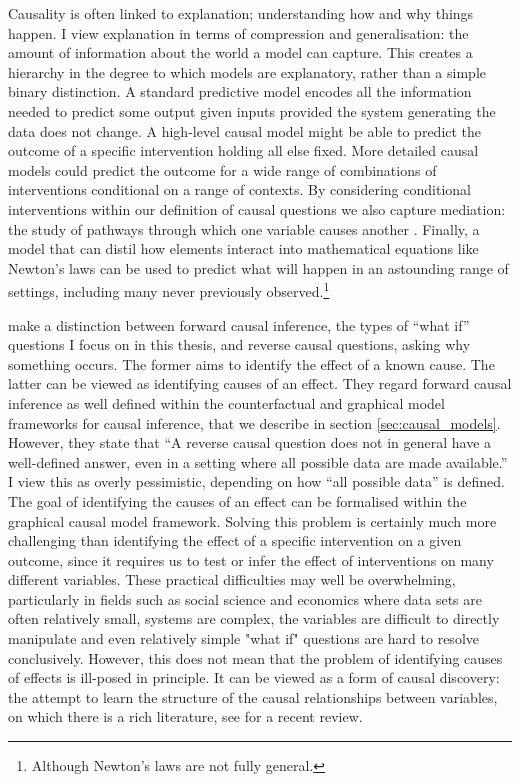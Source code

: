 \documentclass[11pt,a4paper,twoside]{report}
\newcommand{\quotes}[1]{``#1''}
\theoremstyle{plain}
\theoremstyle{definition}
\begin{document}
Causality is often linked to explanation; understanding how and why things happen. I view explanation in terms of compression and generalisation: the amount of information about the world a model can capture. This creates a hierarchy in the degree to which models are explanatory, rather than a simple binary distinction. A standard predictive model encodes all the information needed to predict some output given inputs provided the system generating the data does not change. A high-level causal model might be able to predict the outcome of a specific intervention holding all else fixed. More detailed causal models could predict the outcome for a wide range of combinations of interventions conditional on a range of contexts. By considering conditional interventions within our definition of causal questions we also capture mediation: the study of pathways through which one variable causes another \cite{vanderweele2015explanation}. Finally, a model that can distil how elements interact into mathematical equations like Newton's laws can be used to predict what will happen in an astounding range of settings, including many never previously observed.\footnote{Although Newton's laws are not fully general.}

\citet{Gelman2010,gelman2013ask} make a distinction between forward causal inference, the types of \quotes{what if} questions I focus on in this thesis, and reverse causal questions, asking why something occurs. The former aims to identify the effect of a known cause. The latter can be viewed as identifying causes of an effect. They regard forward causal inference as well defined within the counterfactual and graphical model frameworks for causal inference, that we describe in section \ref{sec:causal_models}. However, they state that \quotes{A reverse causal question does not in general have a well-defined answer, even in a setting where all possible data are made available.} I view this as overly pessimistic, depending on how \quotes{all possible data} is defined. The goal of identifying the causes of an effect can be formalised within the graphical causal model framework. Solving this problem is certainly much more challenging than identifying the effect of a specific intervention on a given outcome, since it requires us to test or infer the effect of interventions on many different variables. These practical difficulties may well be overwhelming, particularly in fields such as social science and economics where data sets are often relatively small, systems are complex, the variables are difficult to directly manipulate and even relatively simple "what if" questions are hard to resolve conclusively. However, this does not mean that the problem of identifying causes of effects is ill-posed in principle. It can be viewed as a form of causal discovery: the attempt to learn the structure of the causal relationships between variables, on which there is a rich literature, see \citet{Spirtes2016} for a recent review.
\end{document}
